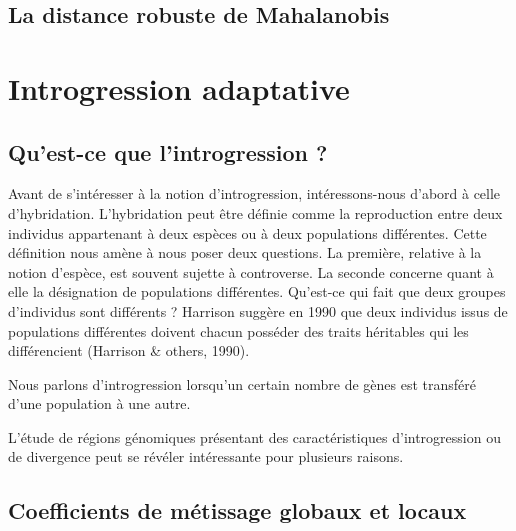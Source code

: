 \documentclass[12pt,twoside]{reedthesis}
\begin{document}
  \newpage
  
  \section{La distance robuste de
  Mahalanobis}\label{la-distance-robuste-de-mahalanobis}
  
  \newpage
  
  
  
  \newpage
  
  \chapter{Introgression adaptative}\label{introgression-adaptative-1}
  
  \section{Qu'est-ce que l'introgression
  ?}\label{quest-ce-que-lintrogression}
  
  Avant de s'intéresser à la notion d'introgression, intéressons-nous
  d'abord à celle d'hybridation. L'hybridation peut être définie comme la
  reproduction entre deux individus appartenant à deux espèces ou à deux
  populations différentes. Cette définition nous amène à nous poser deux
  questions. La première, relative à la notion d'espèce, est souvent
  sujette à controverse. La seconde concerne quant à elle la désignation
  de populations différentes. Qu'est-ce qui fait que deux groupes
  d'individus sont différents ? Harrison suggère en 1990 que deux
  individus issus de populations différentes doivent chacun posséder des
  traits héritables qui les différencient (Harrison \& others, 1990).
  
  Nous parlons d'introgression lorsqu'un certain nombre de gènes est
  transféré d'une population à une autre.
  
  L'étude de régions génomiques présentant des caractéristiques
  d'introgression ou de divergence peut se révéler intéressante pour
  plusieurs raisons.
  
  \section{Coefficients de métissage globaux et
  locaux}\label{coefficients-de-metissage-globaux-et-locaux}
  
\end{document}
